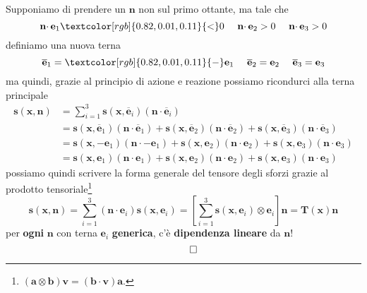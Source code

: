\documentclass[10pt,a4paper,twoside]{book}
\begin{document}
Supponiamo di prendere un $\mathbf{n}$ non sul primo ottante, ma tale che
\begin{equation*}
\mathbf{n} \cdotp \mathbf{e}_{1}\textcolor[rgb]{0.82,0.01,0.11}{< } 0\ \ \ \ \mathbf{n} \cdotp \mathbf{e}_{2}  >0\ \ \ \ \mathbf{n} \cdotp \mathbf{e}_{3}  >0
\end{equation*}
definiamo una nuova terna
\begin{equation*}
\overline{\mathbf{e}}_{1} =\textcolor[rgb]{0.82,0.01,0.11}{-}\mathbf{e}_{1} \ \ \ \ \overline{\mathbf{e}}_{2} =\mathbf{e}_{2} \ \ \ \ \overline{\mathbf{e}}_{3} =\mathbf{e}_{3}
\end{equation*}
ma quindi, grazie al principio di azione e reazione possiamo ricondurci alla terna principale
\begin{equation*}
\begin{aligned}
\mathbf{s}(\mathbf{x} ,\mathbf{n}) & =\sum\limits ^{3}_{i=1}\mathbf{s}(\mathbf{x} ,\overline{\mathbf{e}}_{i})(\mathbf{n} \cdotp \overline{\mathbf{e}}_{i})\\
 & =\mathbf{s}(\mathbf{x} ,\overline{\mathbf{e}}_{1})(\mathbf{n} \cdotp \overline{\mathbf{e}}_{1}) +\mathbf{s}(\mathbf{x} ,\overline{\mathbf{e}}_{2})(\mathbf{n} \cdotp \overline{\mathbf{e}}_{2}) +\mathbf{s}(\mathbf{x} ,\overline{\mathbf{e}}_{3})(\mathbf{n} \cdotp \overline{\mathbf{e}}_{3})\\
 & =\mathbf{s}(\mathbf{x} ,-\mathbf{e}_{1})(\mathbf{n} \cdotp -\mathbf{e}_{1}) +\mathbf{s}(\mathbf{x} ,\mathbf{e}_{2})(\mathbf{n} \cdotp \mathbf{e}_{2}) +\mathbf{s}(\mathbf{x} ,\mathbf{e}_{3})(\mathbf{n} \cdotp \mathbf{e}_{3})\\
 & =\mathbf{s}(\mathbf{x} ,\mathbf{e}_{1})(\mathbf{n} \cdotp \mathbf{e}_{1}) +\mathbf{s}(\mathbf{x} ,\mathbf{e}_{2})(\mathbf{n} \cdotp \mathbf{e}_{2}) +\mathbf{s}(\mathbf{x} ,\mathbf{e}_{3})(\mathbf{n} \cdotp \mathbf{e}_{3})
\end{aligned}
\end{equation*}
possiamo quindi scrivere la forma generale del tensore degli sforzi grazie al prodotto tensoriale\footnote{$(\mathbf{a} \otimes \mathbf{b})\mathbf{v} =(\mathbf{b} \cdotp \mathbf{v})\mathbf{a}$.}
\begin{equation*}
\boxed{\mathbf{s}(\mathbf{x} ,\mathbf{n}) =\sum\limits ^{3}_{i=1}(\mathbf{n} \cdotp \mathbf{e}_{i})\mathbf{s}(\mathbf{x} ,\mathbf{e}_{i}) =\left[\sum\limits ^{3}_{i=1}\mathbf{s}(\mathbf{x} ,\mathbf{e}_{i}) \otimes \mathbf{e}_{i}\right]\mathbf{n} =\mathbf{T}(\mathbf{x})\mathbf{n}}
\end{equation*}
per \textbf{ogni} $\mathbf{n}$ con terna $\mathbf{e}_{i}$ \textbf{generica}, c'è \textbf{dipendenza lineare} da $\mathbf{n}$!
\begin{equation*}
\qed 
\end{equation*}
\end{document}
